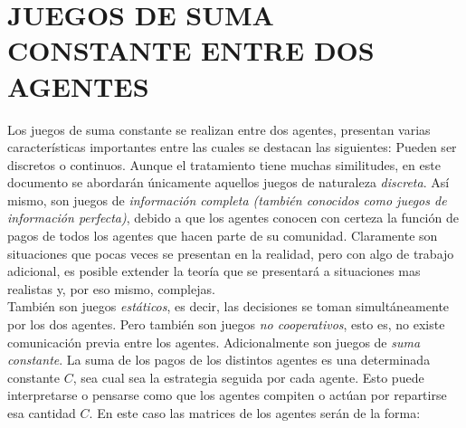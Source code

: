 \section{JUEGOS DE SUMA CONSTANTE ENTRE DOS AGENTES}\label{Sec:Juegos_SC2A}

Los juegos de suma constante se realizan entre dos agentes, presentan varias características importantes entre las cuales se destacan las siguientes: Pueden ser discretos o continuos. Aunque el tratamiento tiene muchas similitudes, en este documento se abordarán únicamente aquellos juegos de naturaleza \textit{discreta}. Así mismo, son juegos de \textit{información completa (también conocidos como juegos de información perfecta)}, debido a que los agentes conocen con certeza la función de pagos de todos los agentes que hacen parte de su comunidad. Claramente son situaciones que pocas veces se presentan en la realidad, pero con algo de trabajo adicional, es posible extender la teoría que se presentará a situaciones mas realistas y, por eso mismo, complejas.
\\
También son juegos \textit{estáticos}, es decir, las decisiones se toman simultáneamente por los dos agentes. Pero también son juegos \textit{no cooperativos}, esto es, no existe comunicación previa entre los agentes. Adicionalmente son juegos de \textit{suma constante}. La suma de los pagos de los distintos agentes es una determinada constante $C$, sea cual sea la estrategia seguida por cada agente. Esto puede interpretarse o pensarse como que los agentes compiten o actúan por repartirse esa cantidad $C$. En este caso las matrices de los agentes serán de la forma:
\\
 
